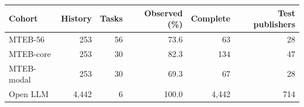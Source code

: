 \begin{tabular}{lrrrrr}
\toprule Cohort & History & Tasks & Observed (\%) & Complete & Test publishers\\\midrule
MTEB-56 & 253 & 56 & 73.6 & 63 & 28\\
MTEB-core & 253 & 30 & 82.3 & 134 & 47\\
MTEB-modal & 253 & 30 & 69.3 & 67 & 28\\
Open LLM & 4,442 & 6 & 100.0 & 4,442 & 714\\
\bottomrule\end{tabular}